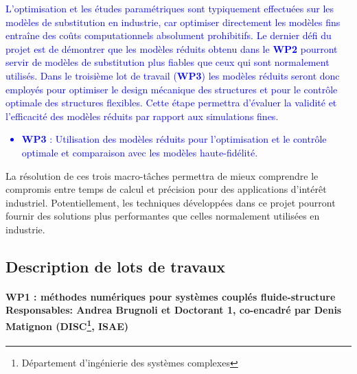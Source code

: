 \documentclass[12pt, french]{article}
\newcommand{\review}[1]{\textcolor{blue}{#1}}
\begin{document}
\review{ L'optimisation et les études paramétriques sont typiquement effectuées sur les
modèles de substitution en industrie, car optimiser directement les modèles fins entraîne des coûts computationnels absolument prohibitifs. Le dernier défi du projet est de démontrer que les modèles réduits obtenu dans le \textbf{WP2} pourront servir de modèles de substitution plus fiables que ceux qui sont normalement utilisés. Dans le troisième lot de travail (\textbf{WP3}) les modèles réduits seront donc employés pour optimiser le design mécanique des structures et pour le contrôle optimale des structures flexibles. Cette étape permettra d’évaluer la validité et l’efficacité des modèles réduits par rapport aux simulations fines. 
	\begin{itemize}
		\item \textbf{WP3} : Utilisation des modèles réduits pour l'optimisation et le contrôle optimale et comparaison avec les  modèles haute-fidélité.
	\end{itemize}
}	
La résolution de ces trois macro-tâches permettra de mieux comprendre le compromis entre temps de calcul et précision pour des applications d'intérêt industriel. Potentiellement, les techniques développées dans ce projet pourront fournir des solutions plus performantes que celles normalement utilisées en industrie. 

\newpage
\subsection{Description de lots de travaux}
	
	
	\paragraph[\large WP1 : méthodes numériques pour systèmes couplés fluide-structure\\
	Responsables: Andrea Brugnoli et Doctorant 1, co-encadré par Denis Matignon (DISC, ISAE)]{\large WP1 : méthodes numériques pour systèmes couplés fluide-structure\\
		Responsables: Andrea Brugnoli et Doctorant 1, co-encadré par Denis Matignon (DISC\footnote{Département d’ingénierie des systèmes complexes}, ISAE)\\}
	
\end{document}
